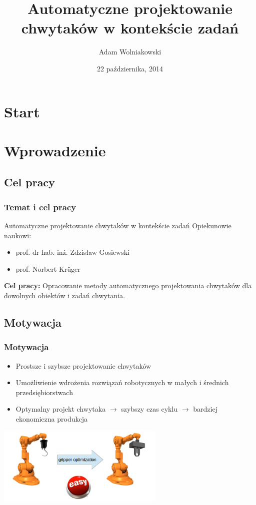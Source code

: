 \documentclass[12pt,a4paper,portrait]{beamer}
\author[AW]{Adam Wolniakowski}
\institute[WM PB]{Politechnika Białostocka}
\title[PhD]{Automatyczne projektowanie chwytaków w kontekście zadań}
\date{22 października, 2014}
\begin{document}
\section{Start}
\begin{frame}
\titlepage
\end{frame}



\section{Wprowadzenie}
\subsection{Cel pracy}
\begin{frame}
\frametitle{Temat i cel pracy}
\begin{block}{Automatyczne projektowanie chwytaków w kontekście zadań}
Opiekunowie naukowi:
\begin{itemize}
\item prof. dr hab. inż. Zdzisław Gosiewski
\item prof. Norbert Krüger
\end{itemize}
\end{block}


\textbf{Cel pracy:} Opracowanie metody automatycznego projektowania chwytaków dla dowolnych obiektów i zadań chwytania.
\end{frame}

\subsection{Motywacja}
\begin{frame}
\frametitle{Motywacja}
\begin{itemize}
\item Prostsze i szybsze projektowanie chwytaków
\item Umożliwienie wdrożenia rozwiązań robotycznych w małych i średnich przedsiębiorstwach
\item Optymalny projekt chwytaka $\rightarrow$ szybszy czas cyklu $\rightarrow$ bardziej ekonomiczna produkcja
\end{itemize}
\begin{center}
\includegraphics[width=0.6\textwidth]{images/motivation}
\end{center}
\end{frame}
\end{document}
